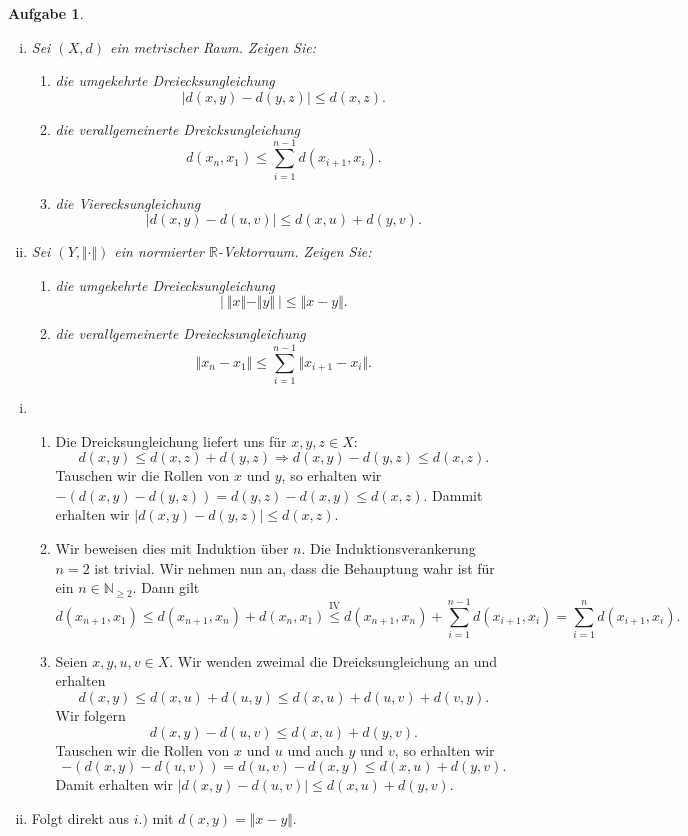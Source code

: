 \documentclass[a4paper, 20]{exam}
\newtheorem{ex}{Aufgabe}
\newcommand\RR{\mathbb{R}}
\newcommand\NN{\mathbb{N}}
\begin{document}
\begin{ex}
\begin{enumerate}[i.)]
\item Sei $(X,d)$ ein metrischer Raum. Zeigen Sie:
\begin{enumerate}
\item
die umgekehrte Dreiecksungleichung
$$ \vert d(x,y) - d(y, z) \vert \leq d(x, z).$$
\item
die verallgemeinerte Dreicksungleichung
$$ d(x_n, x_1) \leq \sum_{i=1}^{n-1} d(x_{i+1}, x_i) .$$
\item
die Vierecksungleichung
$$ \vert d(x,y) - d(u,v) \vert \leq d(x,u) + d(y,v) .$$
\end{enumerate}

\item Sei $(Y, \Vert \cdot \Vert)$ ein normierter $\RR$-Vektorraum. Zeigen Sie:
\begin{enumerate}
\item
die umgekehrte Dreiecksungleichung
$$ \big\vert \ \Vert x \Vert - \Vert y \Vert \ \big\vert \leq \Vert x -y \Vert .$$
\item
die verallgemeinerte Dreiecksungleichung
$$ \Vert x_n - x_1 \Vert \leq \sum_{i=1}^{n-1} \Vert x_{i+1} - x_i \Vert .$$
\end{enumerate}
\end{enumerate}
\end{ex}
\begin{solution}
\begin{enumerate}[i.)]
\item
\begin{enumerate}
\item
Die Dreicksungleichung liefert uns f\"ur $x,y,z \in X$:
$$d(x, y) \leq d(x, z) + d(y,z) \Rightarrow d(x,y) - d(y,z) \leq d(x,z) .$$
Tauschen wir die Rollen von $x$ und $y$, so erhalten wir $-(d(x,y) - d(y,z)) = d(y,z) - d(x,y) \leq d(x,z)$. Dammit erhalten wir $ \vert d(x,y) - d(y, z) \vert \leq d(x, z).$
\item
Wir beweisen dies mit Induktion \"uber $n$. Die Induktionsverankerung $n=2$ ist trivial. Wir nehmen nun an, dass die Behauptung wahr ist f\"ur ein $n\in \NN_{\geq 2}$. Dann gilt
$$ d(x_{n+1}, x_1) \leq d(x_{n+1}, x_n) + d(x_n, x_1) 
\stackrel{\text{IV}}{\leq} d(x_{n+1}, x_n) + \sum_{i=1}^{n-1} d(x_{i+1}, x_i) = \sum_{i=1}^{n} d(x_{i+1}, x_i).$$ 
\item
Seien $x,y,u, v \in X$. Wir wenden zweimal die Dreicksungleichung an und erhalten
$$ d(x,y) \leq d(x,u) + d(u,y) \leq  d(x,u) + d(u,v) + d(v, y).$$
Wir folgern
$$ d(x,y) - d(u, v) \leq d(x,u) + d(y, v). $$
Tauschen wir die Rollen von $x$ und $u$ und auch $y$ und $v$, so erhalten wir
$$- (d(x,y) - d(u, v)) = d(u,v) - d(x,y) \leq  d(x,u) + d(y, v).$$
Damit erhalten wir $\vert d(x,y) - d(u,v) \vert \leq d(x,u) + d(y,v)$.
\end{enumerate}
\item
Folgt direkt aus $i.)$ mit $d(x,y)= \Vert x -y \Vert$.
\end{enumerate}
\end{solution}
\end{document}
